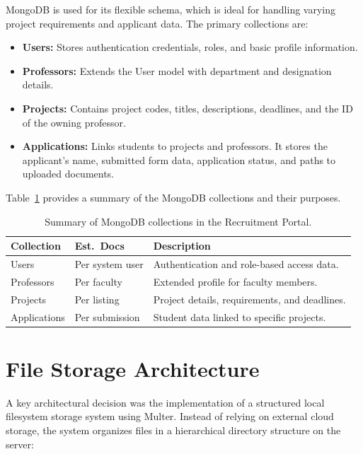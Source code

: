 MongoDB is used for its flexible schema, which is ideal for handling varying project requirements and applicant data. The primary collections are:

\begin{itemize}
  \item \textbf{Users:} Stores authentication credentials, roles, and basic profile information.
  \item \textbf{Professors:} Extends the User model with department and designation details.
  \item \textbf{Projects:} Contains project codes, titles, descriptions, deadlines, and the ID of the owning professor.
  \item \textbf{Applications:} Links students to projects and professors. It stores the applicant's name, submitted form data, application status, and paths to uploaded documents.
\end{itemize}

Table~\ref{tab:collections} provides a summary of the MongoDB collections and their purposes.

\begin{table}[H]
  \centering
  \caption{Summary of MongoDB collections in the Recruitment Portal.}
  \label{tab:collections}
  \begin{tabularx}{\textwidth}{llX}
    \hline
    \textbf{Collection} & \textbf{Est.\ Docs} & \textbf{Description} \\
    \hline
    Users               & Per system user     & Authentication and role-based access data. \\
    Professors          & Per faculty         & Extended profile for faculty members. \\
    Projects            & Per listing         & Project details, requirements, and deadlines. \\
    Applications        & Per submission      & Student data linked to specific projects. \\
    \hline
  \end{tabularx}
\end{table}

\section{File Storage Architecture}

A key architectural decision was the implementation of a structured local filesystem storage system using Multer. Instead of relying on external cloud storage, the system organizes files in a hierarchical directory structure on the server:

